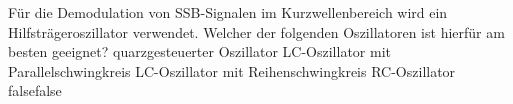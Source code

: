     {Für die Demodulation von SSB-Signalen im Kurzwellenbereich wird ein Hilfsträgeroszillator verwendet. Welcher der folgenden Oszillatoren ist hierfür am besten geeignet?}
    {quarzgesteuerter Oszillator}
    {LC-Oszillator mit Parallelschwingkreis}
    {LC-Oszillator mit Reihenschwingkreis}
    {RC-Oszillator}
    {false}{false}